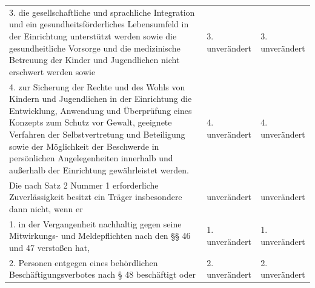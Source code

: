 \documentclass[10pt,a4paper,landscape]{article}
\begin{document}
\begin{longtable}{|L{8.2cm}|L{8.2cm}|L{8.2cm}|}
\hhline{|---|}
3.  \newline die gesellschaftliche und sprachliche  \newline Integration und ein gesundheitsförderliches  \newline Lebensumfeld in der Einrichtung unterstützt  \newline werden sowie die gesundheitliche Vorsorge  \newline und die medizinische Betreuung der Kinder  \newline und Jugendlichen nicht erschwert werden  \newline sowie & 3. unverändert & 3. unverändert \\
\hhline{|---|}
4.  \newline zur Sicherung der Rechte und des Wohls  \newline von Kindern und Jugendlichen in der  \newline Einrichtung die Entwicklung, Anwendung  \newline und Überprüfung eines Konzepts zum  \newline Schutz vor Gewalt, geeignete Verfahren  \newline der Selbstvertretung und Beteiligung sowie  \newline der Möglichkeit der Beschwerde in  \newline persönlichen Angelegenheiten innerhalb  \newline und außerhalb der Einrichtung  \newline gewährleistet werden. & 4. unverändert & 4. unverändert \\
\hhline{|---|}
Die nach Satz 2 Nummer 1 erforderliche  \newline Zuverlässigkeit besitzt ein Träger  \newline insbesondere dann nicht, wenn er & unverändert & unverändert \\
\hhline{|---|}
1.  \newline in der Vergangenheit nachhaltig gegen  \newline seine Mitwirkungs- und Meldepflichten  \newline nach den \S{}\S{} 46 und 47 verstoßen hat, & 1. unverändert & 1. unverändert \\
\hhline{|---|}
2.  \newline Personen entgegen eines behördlichen  \newline Beschäftigungsverbotes nach \S{} 48  \newline beschäftigt oder & 2. unverändert & 2. unverändert \\

\end{longtable}
\end{document}
